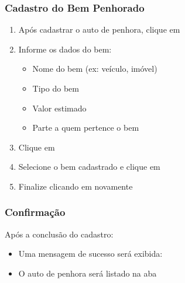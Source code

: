 \documentclass[letterpaper,10pt,brazil]{sphinxmanual}
\begin{document}
\subsubsection{Cadastro do Bem Penhorado}
\label{\detokenize{projud_21_cadastrobempenhora:cadastro-do-bem-penhorado}}\begin{enumerate}
%
\item {} 
\sphinxAtStartPar
Após cadastrar o auto de penhora, clique em 

\item {} 
\sphinxAtStartPar
Informe os dados do bem:
\begin{itemize}
\item {} 
\sphinxAtStartPar
Nome do bem (ex: veículo, imóvel)

\item {} 
\sphinxAtStartPar
Tipo do bem

\item {} 
\sphinxAtStartPar
Valor estimado

\item {} 
\sphinxAtStartPar
Parte a quem pertence o bem

\end{itemize}

\item {} 
\sphinxAtStartPar
Clique em 

\item {} 
\sphinxAtStartPar
Selecione o bem cadastrado e clique em 

\item {} 
\sphinxAtStartPar
Finalize clicando em  novamente

\end{enumerate}


\subsubsection{Confirmação}
\label{\detokenize{projud_21_cadastrobempenhora:confirmacao}}
\sphinxAtStartPar
Após a conclusão do cadastro:
\begin{itemize}
\item {} 
\sphinxAtStartPar
Uma mensagem de sucesso será exibida:

\item {} 
\sphinxAtStartPar
O auto de penhora será listado na aba 

\end{itemize}
\end{document}
